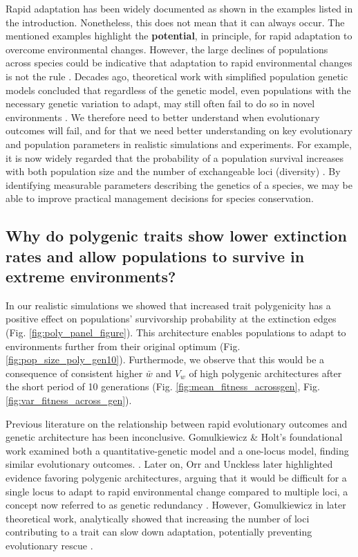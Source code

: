 \documentclass{article}
\begin{document}
Rapid adaptation has been widely documented as shown in the examples listed in the introduction. Nonetheless, this does not mean that it can always occur. The mentioned examples highlight the \textbf{potential}, in principle, for rapid adaptation to overcome environmental changes. However, the large declines of populations across species could be indicative that adaptation to rapid environmental changes is not the rule \citep{ias_ipbes_2023}. Decades ago, theoretical work with simplified population genetic models concluded that regardless of the genetic model, even populations with the necessary genetic variation to adapt, may still often fail to do so in novel environments \citep{Gomulkiewicz1995-sj}. We therefore need to better understand when evolutionary outcomes will fail, and for that we need better understanding on key evolutionary and population parameters in realistic simulations and experiments. For example, it is now widely regarded that the probability of a population survival increases with both population size and the number of exchangeable loci (diversity) \citep{Newman1997-tx, Markert2010-wc, Nabutanyi2022-jb}. By identifying measurable parameters describing the genetics of a species, we may be able to improve practical management decisions for species conservation. 

\subsection{Why do polygenic traits show lower extinction rates and allow populations to survive in extreme environments?}
In our realistic simulations we showed that increased trait polygenicity has a positive effect on populations' survivorship probability at the extinction edges (Fig. \ref{fig:poly_panel_figure}). This architecture enables populations to adapt to environments further from their original optimum (Fig. \ref{fig:pop_size_poly_gen10}). Furthermode, we observe that this would be a consequence of consistent higher  $\bar{w}$ and $V_w$ of high polygenic architectures after the short period of 10 generations (Fig. \ref{fig:mean_fitness_acrossgen}, Fig. \ref{fig:var_fitness_across_gen}).

Previous literature on the relationship between rapid evolutionary outcomes and genetic architecture has been inconclusive. Gomulkiewicz \& Holt’s foundational work examined both a quantitative-genetic model and a one-locus model, finding similar evolutionary outcomes. \citep{Gomulkiewicz1995-sj}. Later on, Orr and Unckless later highlighted evidence favoring polygenic architectures, arguing that it would be difficult for a single locus to adapt to rapid environmental change compared to multiple loci, a concept now referred to as genetic redundancy \citep{Laruson2020-kd}. However, Gomulkiewicz in later theoretical work, analytically showed that increasing the number of loci contributing to a trait can slow down adaptation, potentially preventing evolutionary rescue \citep{Gomulkiewicz2010-wr}.
\end{document}
